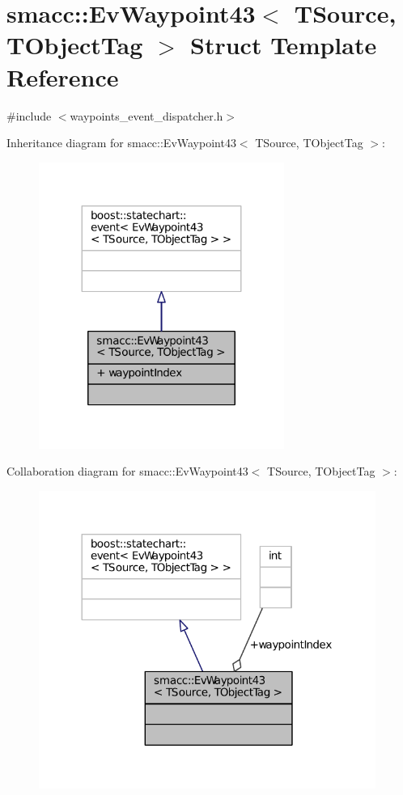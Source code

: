 \hypertarget{structsmacc_1_1EvWaypoint43}{}\section{smacc\+:\+:Ev\+Waypoint43$<$ T\+Source, T\+Object\+Tag $>$ Struct Template Reference}
\label{structsmacc_1_1EvWaypoint43}


{\ttfamily \#include $<$waypoints\+\_\+event\+\_\+dispatcher.\+h$>$}



Inheritance diagram for smacc\+:\+:Ev\+Waypoint43$<$ T\+Source, T\+Object\+Tag $>$\+:
\nopagebreak
\begin{figure}[H]
\begin{center}
\leavevmode
\includegraphics[width=227pt]{structsmacc_1_1EvWaypoint43__inherit__graph}
\end{center}
\end{figure}


Collaboration diagram for smacc\+:\+:Ev\+Waypoint43$<$ T\+Source, T\+Object\+Tag $>$\+:
\nopagebreak
\begin{figure}[H]
\begin{center}
\leavevmode
\includegraphics[width=312pt]{structsmacc_1_1EvWaypoint43__coll__graph}
\end{center}
\end{figure}

